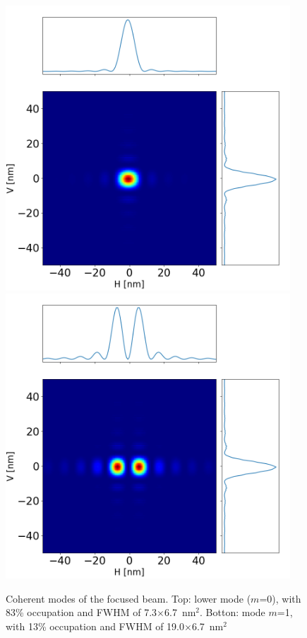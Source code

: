 \documentclass{iucr}              %
\newcommand{\todo}[1]{{\color{red}[TODO: "#1'']}}
\begin{document}
\begin{figure}\label{fig:final modes}
    \centering
        \includegraphics[width=0.95\textwidth]{GRAPHICS/final_mode0.png}
        \includegraphics[width=0.95\textwidth]{GRAPHICS/final_mode1.png}
    \caption{Coherent modes of the focused beam. Top: lower mode ($m$=0), with 83\% occupation and FWHM of 7.3$\times$6.7~nm$^2$. Botton: mode $m$=1, with 13\% occupation and FWHM of 19.0$\times$6.7~nm$^2$}
\end{figure}
 
\end{document}
